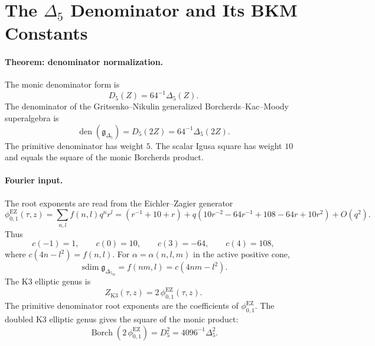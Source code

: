 \providecommand{\kcat}{\kappa_{\mathrm{cat}}}
\providecommand{\kch}{\kappa_{\mathrm{ch}}}
\providecommand{\kBKM}{\kappa_{\mathrm{BKM}}}
\providecommand{\kfiber}{\kappa_{\mathrm{fiber}}}
\providecommand{\LII}{\Lambda^{2,1}_{\mathrm{II}}}
\providecommand{\PII}{\mathcal{P}_{\mathrm{II}}}
\providecommand{\CII}{\mathcal{C}(\LII)_+}
\providecommand{\DII}{\Delta(\LII)_+}
\providecommand{\Dfive}{D_5}
\providecommand{\DeltaFive}{\Delta_{5}}
\providecommand{\gBKM}{\mathfrak{g}_{\Delta_{5}}}
\providecommand{\Wtwo}{W^{(2)}(\LII)}
\providecommand{\phiEZ}{\phi_{0,1}^{\mathrm{EZ}}}
\providecommand{\ZKthree}{Z_{\mathrm{K3}}}
\providecommand{\CoHA}{\operatorname{CoHA}}
\providecommand{\Yplus}{Y^+}
\providecommand{\Wone}{\mathcal{W}_{1+\infty}}
\providecommand{\Cthree}{\mathbb C^3}

\section*{The \texorpdfstring{$\Delta_{5}$}{Delta5} Denominator and Its BKM Constants}

\paragraph{Theorem: denominator normalization.}
The monic denominator form is
\[
  \Dfive(Z)=64^{-1}\DeltaFive(Z).
\]
The denominator of the Gritsenko--Nikulin generalized
Borcherds--Kac--Moody superalgebra is
\[
  \operatorname{den}(\gBKM)=\Dfive(2Z)=64^{-1}\DeltaFive(2Z).
\]
The primitive denominator has weight \(5\).  The scalar Igusa square has
weight \(10\) and equals the square of the monic Borcherds product.

\paragraph{Fourier input.}
The root exponents are read from the Eichler--Zagier generator
\[
  \phiEZ(\tau,z)=\sum_{n,l} f(n,l)q^n r^l
  =(r^{-1}+10+r)
  +q(10r^{-2}-64r^{-1}+108-64r+10r^2)+O(q^2).
\]
Thus
\[
  c(-1)=1,\qquad c(0)=10,\qquad c(3)=-64,\qquad c(4)=108,
\]
where \(c(4n-l^2)=f(n,l)\).  For
\(\alpha=\alpha(n,l,m)\) in the active positive cone,
\[
  \operatorname{sdim}\gBKM_{\alpha}=f(nm,l)=c(4nm-l^2).
\]
The K3 elliptic genus is
\[
  \ZKthree(\tau,z)=2\,\phiEZ(\tau,z).
\]
The primitive denominator root exponents are the coefficients of
\(\phiEZ\).  The doubled K3 elliptic genus gives the square of the
monic product:
\[
  \operatorname{Borch}(2\,\phiEZ)=\Dfive^2=4096^{-1}\DeltaFive^2.
\]


